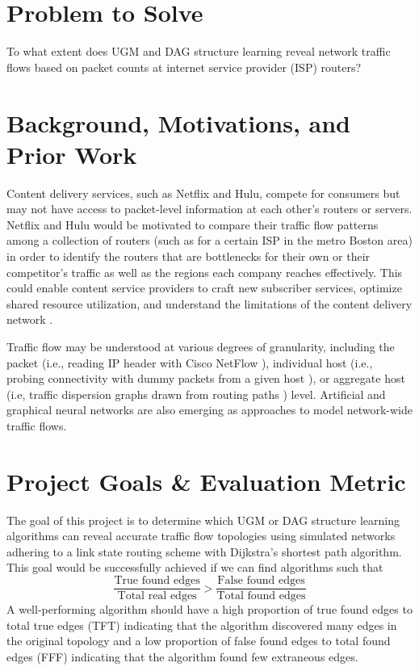 \documentclass[conference]{IEEEtran}
\begin{document}
\section{Problem to Solve}

To what extent does UGM and DAG structure learning reveal network traffic flows based on packet counts at internet service provider (ISP) routers?

\section{Background, Motivations, and Prior Work}

Content delivery services, such as Netflix and Hulu, compete for consumers but may not have access to packet-level information at each other's routers or servers. Netflix and Hulu would be motivated to compare their traffic flow patterns among a collection of routers (such as for a certain ISP in the metro Boston area) in order to identify the routers that are bottlenecks for their own or their competitor's traffic as well as the regions each company reaches effectively. This could enable content service providers to craft new subscriber services, optimize shared resource utilization, and understand the limitations of the content delivery network \cite{b1}.

Traffic flow may be understood at various degrees of granularity, including the packet (i.e., reading IP header with Cisco NetFlow \cite{b2}), individual host (i.e., probing connectivity with dummy packets from a given host \cite{b3}), or aggregate host (i.e, traffic dispersion graphs drawn from routing paths \cite{b1}) level. Artificial \cite{b4} and graphical \cite{b5} neural networks are also emerging as approaches to model network-wide traffic flows.

\section{Project Goals \& Evaluation Metric}

The goal of this project is to determine which UGM or DAG structure learning algorithms can reveal accurate traffic flow topologies using simulated networks adhering to a link state routing scheme with Dijkstra's shortest path algorithm. This goal would be successfully achieved if we can find algorithms such that
\[
\frac{\text{True found edges}}{\text{Total real edges}} > \frac{\text{False found edges}}{\text{Total found edges}}
\]
A well-performing algorithm should have a high proportion of true found edges to total true edges (TFT) indicating that the algorithm discovered many edges in the original topology and a low proportion of false found edges to total found edges (FFF) indicating that the algorithm found few extraneous edges.
\end{document}
